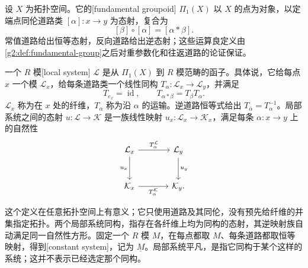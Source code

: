 \begin{definition}[局部系统]\label{g2:def:local-system}
	设 \(X\) 为拓扑空间。它的[fundamental groupoid] \(\Pi_1(X)\) 以 \(X\) 的点为对象，以定端点同伦道路类 \([\alpha]:x\to y\) 为态射，复合为
	\[
		[\beta]\circ[\alpha]=[\alpha*\beta].
	\]
	常值道路给出恒等态射，反向道路给出逆态射；这些运算良定义由\cref{g2:def:fundamental-group}之后对重参数化和往返道路的论证保证。

	一个 \(R\) 模[local system] \(\mathcal L\) 是从 \(\Pi_1(X)\) 到 \(R\) 模范畴的函子。具体说，它给每点 \(x\) 一个模 \(\mathcal L_x\)，给每条道路类一个线性同构 \(T_\alpha:\mathcal L_x\to\mathcal L_y\)，并满足
	\begin{equation}\label{g2:eq:local-transport-composition}
		T_{e_x}=\operatorname{id},\qquad T_{\alpha*\beta}=T_\beta T_\alpha.
	\end{equation}
	\(\mathcal L_x\) 称为在 \(x\) 处的纤维，\(T_\alpha\) 称为沿 \(\alpha\) 的运输。逆道路恒等式给出 \(T_{\bar\alpha}=T_\alpha^{-1}\)。局部系统之间的态射 \(u:\mathcal L\to\mathcal K\) 是一族线性映射 \(u_x:\mathcal L_x\to\mathcal K_x\)，满足每条 \(\alpha:x\to y\) 上的自然性
	\[
		\begin{tikzcd}[column sep=large,row sep=large]
			\mathcal L_x \arrow[r,"T^{\mathcal L}_\alpha"] \arrow[d,"u_x"'] & \mathcal L_y \arrow[d,"u_y"] \\
			\mathcal K_x \arrow[r,"T^{\mathcal K}_\alpha"'] & \mathcal K_y.
		\end{tikzcd}
	\]
\end{definition}

这个定义在任意拓扑空间上有意义；它只使用道路及其同伦，没有预先给纤维的并集指定拓扑。两个局部系统同构，指存在各纤维上均为同构的态射，其逆映射族自动满足同一自然性方形。固定一个 \(R\) 模 \(M\)，在每点都取 \(M\)、每条道路都取恒等映射，得到[constant system]，记为 \(\underline M\)。局部系统平凡，是指它同构于某个这样的系统；这并不表示已经选定那个同构。

